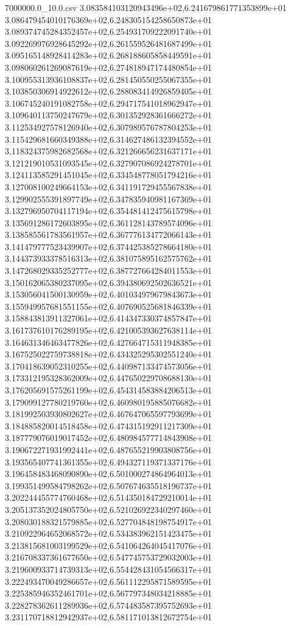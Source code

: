 \begin{filecontents*}{7000000.0_10.0.csv}
3.083584103120943496e+02,6.241679861771353899e+01
3.086479454010176369e+02,6.248305154258650873e+01
3.089374745284352457e+02,6.254931709222091740e+01
3.092269976928645292e+02,6.261559526481687499e+01
3.095165148928414283e+02,6.268188605858449591e+01
3.098060261269087619e+02,6.274818947174480854e+01
3.100955313936108837e+02,6.281450550255067355e+01
3.103850306914922612e+02,6.288083414926859405e+01
3.106745240191082758e+02,6.294717541018962947e+01
3.109640113750247679e+02,6.301352928361666272e+01
3.112534927578126940e+02,6.307989576787804253e+01
3.115429681660349388e+02,6.314627486132394552e+01
3.118324375982682568e+02,6.321266656231637171e+01
3.121219010531093545e+02,6.327907086924278701e+01
3.124113585291451045e+02,6.334548778051794216e+01
3.127008100249664153e+02,6.341191729455567838e+01
3.129902555391897749e+02,6.347835940981167369e+01
3.132796950704117194e+02,6.354481412475615798e+01
3.135691286172603895e+02,6.361128143789574096e+01
3.138585561783561957e+02,6.367776134772066143e+01
3.141479777523439907e+02,6.374425385278664180e+01
3.144373933378516313e+02,6.381075895162575762e+01
3.147268029335252777e+02,6.387727664284011553e+01
3.150162065380237095e+02,6.394380692502636521e+01
3.153056041500130959e+02,6.401034979679843673e+01
3.155949957681551155e+02,6.407690525681846339e+01
3.158843813911327061e+02,6.414347330374857847e+01
3.161737610176289195e+02,6.421005393627638114e+01
3.164631346463477826e+02,6.427664715311948385e+01
3.167525022759738818e+02,6.434325295302551240e+01
3.170418639052310255e+02,6.440987133474573056e+01
3.173312195328362009e+02,6.447650229708688130e+01
3.176205691575261199e+02,6.454314583884206513e+01
3.179099127780219760e+02,6.460980195885076682e+01
3.181992503930802627e+02,6.467647065597793699e+01
3.184885820014518458e+02,6.474315192911217309e+01
3.187779076019017452e+02,6.480984577714843908e+01
3.190672271931992441e+02,6.487655219903808756e+01
3.193565407741361355e+02,6.494327119371337176e+01
3.196458483468090890e+02,6.501000274864964013e+01
3.199351499584798262e+02,6.507674635518196737e+01
3.202244455774760468e+02,6.514350184729210014e+01
3.205137352024805750e+02,6.521026922340297460e+01
3.208030188321579885e+02,6.527704848198754917e+01
3.210922964652068572e+02,6.534383962151423475e+01
3.213815681003199529e+02,6.541064264045417076e+01
3.216708337361677650e+02,6.547745753729032003e+01
3.219600933714739313e+02,6.554428431054566317e+01
3.222493470049286657e+02,6.561112295871589595e+01
3.225385946352461701e+02,6.567797348034218885e+01
3.228278362611289936e+02,6.574483587395752693e+01
3.231170718812942937e+02,6.581171013812672754e+01

\end{filecontents*}
